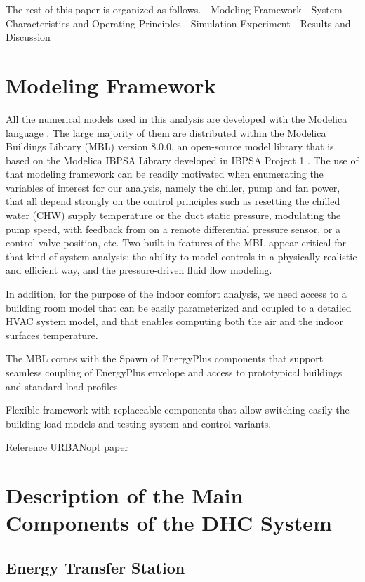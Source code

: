 The rest of this paper is organized as follows.
- Modeling Framework
- System Characteristics and Operating Principles
- Simulation Experiment
- Results and Discussion


\section{Modeling Framework} \label{sec:modeling}

All the numerical models used in this analysis are developed with the Modelica language \citep{MattssonElmqvist1997:1}.
The large majority of them are distributed within the Modelica Buildings Library (MBL) version 8.0.0, an open-source model library that is based on the Modelica IBPSA Library \citep{Wetter2015} developed in IBPSA Project 1 \citep{Wetter2019b}.
The use of that modeling framework can be readily motivated when enumerating the variables of interest for our analysis, namely the chiller, pump and fan power, that all depend strongly on the control principles such as resetting the chilled water (CHW) supply temperature or the duct static pressure, modulating the pump speed, with feedback from on a remote differential pressure sensor, or a control valve position, etc.
Two built-in features of the MBL appear critical for that kind of system analysis: the ability
to model controls in a physically realistic and efficient way, and the pressure-driven fluid flow
modeling.

In addition, for the purpose of the indoor comfort analysis, we need access to a building room model that can be easily parameterized and coupled to a detailed HVAC system model, and that enables computing both the air and the indoor surfaces temperature.


The MBL comes with the Spawn of EnergyPlus components \citep{Wetter2020} that support seamless coupling of EnergyPlus envelope and access to prototypical buildings and standard load profiles


Flexible framework with replaceable components that allow switching easily the building load models and testing system and control variants.

Reference URBANopt paper

\section{Description of the Main Components of the DHC System} \label{sec:dhc}

\subsection{Energy Transfer Station} \label{sec:ets}

